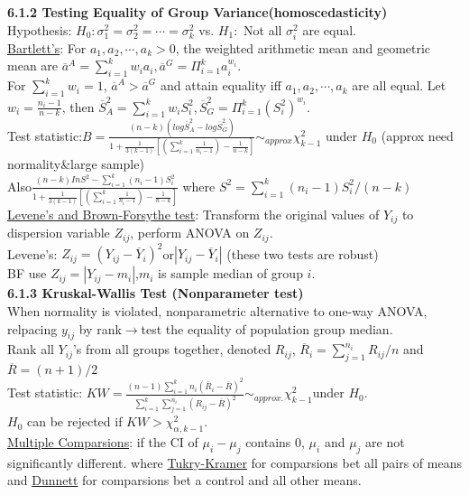 \documentclass[10pt,a4paper,landscape]{article}
\begin{document}
\begin{multicols}{3}
{\begin{table}[H]
\begin{tabular}{c|cccc}
  	\end{tabular}
  \end{table}
  \textbf{6.1.2 Testing Equality of Group Variance(homoscedasticity)}\\
  Hypothesis: $H_0:\sigma^2_1=\sigma^2_2=\cdots=\sigma^2_k$ vs. $H_1:$ Not all $\sigma^2_i$ are equal.\\
  \underline{Bartlett's}: For $a_1,a_2,\cdots,a_k>0$, the weighted arithmetic mean and geometric mean are $ \overline{a}^A=\sum_{i=1}^k w_ia_i, \overline{a}^G=\Pi_{i=1}^k a_i^{w_i}$. \\
  For $\sum_{i=1}^kw_i=1$, $\overline{a}^A>\overline{a}^G$ and attain equality iff $a_1,a_2,\cdots,a_k$ are all equal. Let $w_i=\frac{n_i-1}{n-k}$, then $\overline{S}^2_A=\sum_{i=1}^k w_iS_i^2,\overline{S}^2_G=\Pi_{i=1}^k (S_i^2)^{w_i} $.\\
  Test statistic:$B=\frac{(n-k)(log\overline{S}^2_A-log\overline{S}^2_G) }{1+\frac{1}{3(k-1)}[(\sum_{i=1}^k\frac{1}{n_i-1} )-\frac{1}{n-k}]}\sim_{approx} \chi^2_{k-1} $ under $H_0$ (approx need normality\&large sample)\\
  Also$\frac{(n-k)InS^2-\sum_{i=1}^k(n_i-1)S_i^2 }{1+\frac{1}{3(k-1)}[(\sum_{i=1}^k\frac{1}{n_i-1} )-\frac{1}{n-k}]} $ where $S^2=\sum_{i=1}^k(n_i-1)S_i^2/(n-k)$\\
  \underline{Levene's and Brown-Forsythe test}:
  Transform the original values of $Y_{ij}$ to dispersion variable $Z_{ij}$, perform ANOVA on $Z_{ij}$.\\
  Levene's: $Z_{ij}=(Y_{ij}-\overline{Y}_i)^2$or$|Y_{ij}-\overline{Y}_i|$ (these two tests are robust)\\
  BF use $Z_{ij}=|Y_{ij}-m_i|$,$m_i$ is sample median of group $i$.\\
  
  \textbf{6.1.3 Kruskal-Wallis Test (Nonparameter test)}\\
  When normality is violated, nonparametric alternative to one-way ANOVA, relpacing $y_{ij}$ by rank$\rightarrow$test the equality of population group median.\\
  Rank all $Y_{ij}$'s from all groups together, denoted $R_{ij}$, $\overline{R}_i=\sum_{j=1}^{n_i}R_{ij}/n$ and $\overline{R}=(n+1)/2$\\
  Test statistic: $KW=\frac{(n-1)\sum_{i=1}^k n_i(\overline{R}_i-\overline{R})^2 }{\sum_{i=1}^k\sum_{j=1}^{n_i}(R_{ij}-\overline{R})^2}\sim _{approx.}\chi^2_{k-1}$under $H_0$.\\
  $H_0$ can be rejected if $KW>\chi^2_{\alpha,k-1}$.\\
  \underline{Multiple Comparsions}: if the CI of $\mu_i-\mu_j$ contains 0, $\mu_i$ and $\mu_j$ are not significantly different. where \underline{Tukry-Kramer} for comparsions bet all pairs of means and \underline{Dunnett} for comparsions bet a control and all other means.
  
}
\end{multicols}
\end{document}
